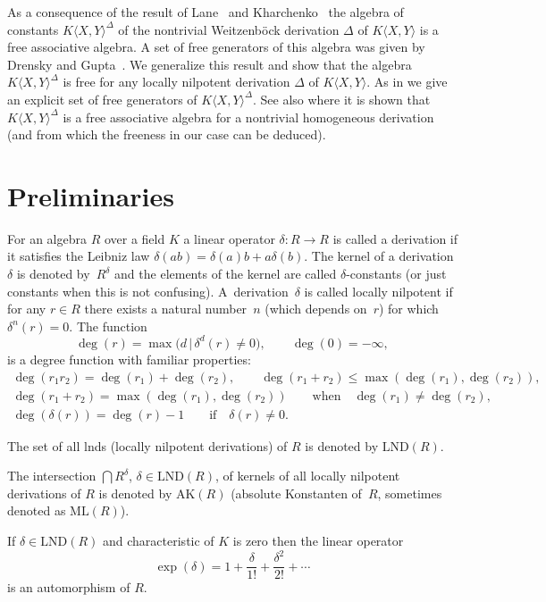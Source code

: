 \documentclass[pdftex]{sigma}
\numberwithin{equation}{section}
\begin{document}
As a consequence of the result of Lane~\cite{L} and Kharchenko~\cite{Kh} the algebra of constants $K\langle X,Y\rangle^{\Delta}$ of the nontrivial Weitzenb\"ock derivation $\Delta$ of $K\langle X,Y\rangle$ is a free associative algebra. A set of free generators of this algebra was given by Drensky and Gupta~\cite{DG}. We generalize this result and show that the algebra $K\langle X,Y\rangle^{\Delta}$ is free for any locally nilpotent derivation $\Delta$ of $K\langle X,Y\rangle$. As in \cite{DG} we give an explicit set of free generators of $K\langle X,Y\rangle^{\Delta}$. See also \cite{Jo} where it is shown that $K\langle X,Y\rangle^{\Delta}$ is a free associative algebra for a nontrivial homogeneous derivation (and from which the freeness in our case can be deduced).

\section{Preliminaries}\label{section2}

For an algebra $R$ over a field $K$ a linear operator $\delta\colon R\rightarrow R$ is called a derivation if it satisfies the Leibniz law $\delta(ab) = \delta(a)b + a\delta(b)$.
The kernel of a derivation $\delta$ is denoted by~$R^{\delta}$ and the elements of the kernel are called $\delta$-constants (or just constants when this is not confusing).
A~derivation~$\delta$ is called locally nilpotent if for any $r \in R$ there exists a natural number~$n$ (which depends on~$r$) for which $\delta^n(r) = 0$. The function
\[
\deg(r) = \max\big(d\,|\, \delta^d(r) \neq 0\big), \qquad \deg(0) = -\infty,
\]
is a degree function with familiar properties:
\begin{gather*}
\deg(r_1r_2) = \deg(r_1) + \deg(r_2),\qquad \deg(r_1 + r_2) \leq \max(\deg(r_1), \deg(r_2)),\\
\deg(r_1 + r_2) =\max(\deg(r_1), \deg(r_2)) \qquad \text{when} \quad \deg(r_1) \neq \deg(r_2),\\
\deg(\delta(r)) = \deg(r) - 1\qquad \text{if} \quad \delta(r) \neq 0.
\end{gather*}

The set of all lnds (locally nilpotent derivations) of $R$ is denoted by $\text{LND}(R)$.

The intersection $\bigcap R^{\delta}$, $\delta \in \text{LND}(R)$, of kernels of all locally nilpotent derivations of $R$ is denoted by $\text{AK}(R)$ (absolute Konstanten of~$R$, sometimes denoted as $\text{ML}(R)$).

If $\delta \in \text{LND}(R)$ and characteristic of $K$ is zero then the linear operator
\[
\exp(\delta)=1+\frac{\delta}{1!}+\frac{\delta^2}{2!}+\cdots
\]
is an automorphism of $R$.
\end{document}
